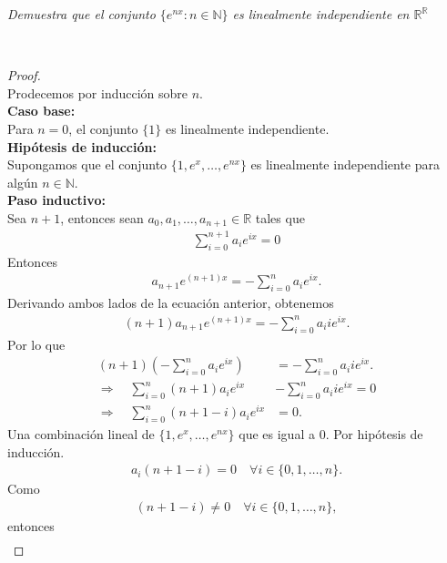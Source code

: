 \documentclass[11pt,letterpaper]{article}
\newcommand{\R}{\mathbb{R}}
\newcommand{\N}{\mathbb{N}}
\begin{document}
\begin{tcolorbox}[
	title = \textcolor{black}{\textcolor{white}{Problema 13}},]
\textit{Demuestra que el conjunto $\{e^{nx}:n\in \N\}$ es linealmente independiente en $\R^\R$
}
\end{tcolorbox}\,\\
\begin{proof}\,\\
    Prodecemos por inducción sobre $n$.\\ 
    \textbf{Caso base:}\\ [10pt] Para $n = 0$, el conjunto $\{1\}$ es linealmente independiente.\\ [10pt]
    \textbf{Hipótesis de inducción:}\\ [10pt] Supongamos que el conjunto $\{1, e^x, \dots, e^{nx}\}$ es linealmente independiente para algún $n \in \N$.\\ [10pt]
    \textbf{Paso inductivo:}\\ [10pt] Sea $n + 1$, entonces sean $a_0, a_1, \dots, a_{n+1} \in \R$ tales que
    \begin{align*}
        \sum_{i=0}^{n+1} a_ie^{ix} = 0
    \end{align*}
    Entonces
    \begin{align*}
        a_{n+1} e^{(n+1)x} =-\sum_{i=0}^{n} a_ie^{ix}.
    \end{align*}
    Derivando ambos lados de la ecuación anterior, obtenemos
    \begin{align*}
        (n+1)a_{n+1}e^{(n+1)x}=-\sum_{i=0}^{n} a_i i e^{ix}.
    \end{align*}
    Por lo que
    \begin{align*}
        (n+1)(-\sum_{i=0}^{n} a_ie^{ix})&=-\sum_{i=0}^{n} a_i i e^{ix}.\\
        \Rightarrow \quad \sum_{i=0}^{n} (n+1)a_ie^{ix}&-\sum_{i=0}^{n} a_i i e^{ix}=0\\
        \Rightarrow \quad \sum_{i=0}^{n}(n+1-i)a_ie^{ix}&=0.
    \end{align*}
    Una combinación lineal de $\{1, e^x, \dots, e^{nx}\}$ que es igual a $0$. Por hipótesis de inducción.
    \begin{align*}
        a_i(n+1-i)=0 \quad \forall i \in \{0,1,\dots,n\}.
    \end{align*}
    Como
    \begin{align*}
        (n+1-i)\neq0 \quad \forall i \in \{0,1,\dots,n\},
    \end{align*}
    entonces
    \begin{align*}

\end{align*}
\end{proof}
\end{document}
